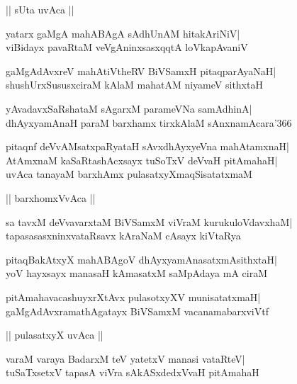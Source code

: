 \documentclass[twoside,12pt,openright]{book}
\newcounter{shloka}[chapter]
\begin{document}
\begin{center}
|| sUta uvAca ||
\end{center}
\begin{shloka}%
yatarx gaMgA mahABAgA sAdhUnAM hitakAriNiV|\\
viBidayx pavaRtaM veVgAninxsasxqqtA loVkapAvaniV
\end{shloka}

\begin{shloka}%
gaMgAdAvxreV mahAtiVtheRV BiVSamxH pitaqparAyaNaH|\\
shushUrxSususxciraM kAlaM mahatAM niyameV sithxtaH
\end{shloka}

\begin{shloka}%
yAvadavxSaRshataM sAgarxM parameVNa samAdhinA|\\
dhAyxyamAnaH paraM barxhamx tirxkAlaM sAnxnamAcara\char'366
\end{shloka}

\begin{shloka}%
pitaqnf deVvAMsatxpaRyataH sAvxdhAyxyeVna mahAtamxnaH|\\
AtAmxnaM kaSaRtashAcxsayx tuSoTxV deVvaH pitAmahaH|\\
uvAca tanayaM barxhAmx pulasatxyXmaqSisatatxmaM
\end{shloka}

\begin{center}
|| barxhomxVvAca ||
\end{center}
\begin{shloka}%
sa tavxM deVvavarxtaM BiVSamxM viVraM kurukuloVdavxhaM|\\
tapasasasxninxvataRsavx kAraNaM cAsayx kiVtaRya
\end{shloka}

\begin{shloka}%
pitaqBakAtxyX mahABAgoV dhAyxyamAnasatxmAsithxtaH|\\
yoV hayxsayx manasaH kAmasatxM saMpAdaya mA ciraM
\end{shloka}

\begin{shloka}%
pitAmahavacashuyxrXtAvx pulasotxyXV munisatatxmaH|\\
gaMgAdAvxramathAgatayx BiVSamxM vacanamabarxviVtf
\end{shloka}

\begin{center}
|| pulasatxyX uvAca ||
\end{center}
\begin{shloka}%
varaM varaya BadarxM teV yatetxV manasi vataRteV|\\
tuSaTxsetxV tapasA viVra sAkASxdedxVvaH pitAmahaH
\end{shloka}
\end{document}
